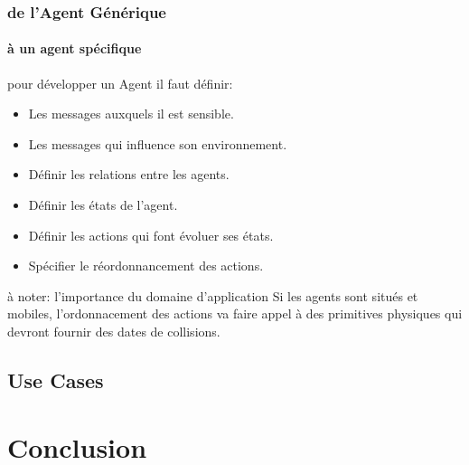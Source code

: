 \documentclass[xetex, compress, table, svgnames]{beamer}
\begin{document}
\begin{frame}
  \frametitle{de l'Agent Générique}
  \framesubtitle{à un agent spécifique}
  \begin{exampleblock}{pour développer un Agent il faut définir:}
    \begin{itemize}
    \item Les messages auxquels il est sensible.
    \item Les messages qui influence son environnement.
    \item Définir les relations entre les agents.
    \item Définir les états de l'agent.
    \item Définir les actions qui font évoluer ses états.
    \item Spécifier le réordonnancement des actions.
    \end{itemize}
  \end{exampleblock}
  \begin{alertblock}{à noter: l'importance du domaine d'application}
    Si les agents sont situés et mobiles, l'ordonnacement des actions va faire appel à des primitives physiques qui devront fournir des dates de collisions.
  \end{alertblock}
\end{frame}

\subsection{Use Cases}

\section{Conclusion}


\end{document}
